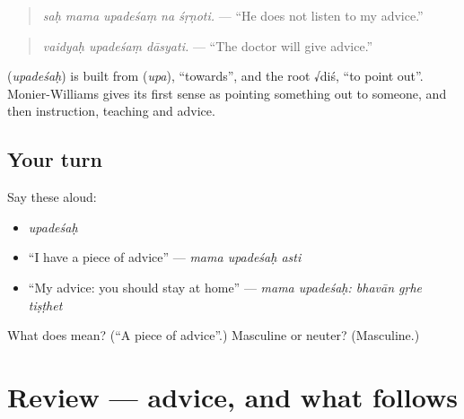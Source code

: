 \begin{quote}
\textbf{    }
\end{quote}

\begin{quote}
\emph{saḥ mama upadeśaṃ na śṛṇoti.} — \textquotedblleft{}He does not listen to my advice.\textquotedblright{}
\end{quote}

\begin{quote}
\textbf{  }
\end{quote}

\begin{quote}
\emph{vaidyaḥ upadeśaṃ dāsyati.} — \textquotedblleft{}The doctor will give advice.\textquotedblright{}
\end{quote}

\begin{cousinweb}
\textbf{} (\emph{upadeśaḥ}) is built from \textbf{} (\emph{upa}), \textquotedblleft{}towards\textquotedblright{}, and the root √diś, \textquotedblleft{}to point out\textquotedblright{}. Monier-Williams gives its first sense as pointing something out to someone, and then instruction, teaching and advice.
\end{cousinweb}

\subsection*{Your turn}
Say these aloud:

\begin{itemize}
\raggedright
  \item \emph{upadeśaḥ}
  \item \textquotedblleft{}I have a piece of advice\textquotedblright{} — \emph{mama upadeśaḥ asti}
  \item \textquotedblleft{}My advice: you should stay at home\textquotedblright{} — \emph{mama upadeśaḥ: bhavān gṛhe tiṣṭhet}
\end{itemize}

\begin{tcolorbox}[breakable,colback=teal!4,colframe=teal!35!black,title={Before you move on}]
What does \textbf{} mean? (\textquotedblleft{}A piece of advice\textquotedblright{}.) Masculine or neuter? (Masculine.)
\end{tcolorbox}
\section[(review)]{Review — advice, and what follows}

